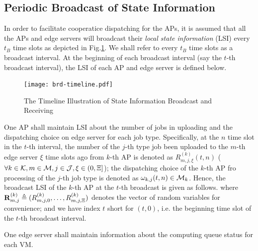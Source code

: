 \subsection{Periodic Broadcast of State Information}
In order to facilitate cooperatice dispatching for the APs, it is assumed that all the APs and edge servers will broadcast their \emph{local state information} (LSI) every $t_B$ time slots as depicted in Fig.\ref{fig:brd-timeline}.
We shall refer to every $t_B$ time slots as a broadcast interval.
At the beginning of each broadcast interval (say the $t$-th broadcast interval), the LSI of each AP and edge server is defined below.

\begin{figure}[ht]
    \centering
    \texttt{[image: brd-timeline.pdf]}
    \caption{The Timeline Illustration of State Information Broadcast and Receiving}
    \label{fig:brd-timeline}
\end{figure}

One AP shall maintain LSI about the number of jobs in uploading and the dispatching choice on edge server for each job type.
Specifically, at the $n$ time slot in the $t$-th interval, the number of the $j$-th type job been uploaded to the $m$-th edge server $\xi$ time slots ago from $k$-th AP is denoted as $R^{(k)}_{m,j,\xi}({t,n})$ ($\forall k\in\mathcal{K}, m\in\mathcal{M}, j\in\mathcal{J}, \xi\in(0,\Xi]$);
the dispatching choice of the $k$-th AP fro processing of the $j$-th job type is denoted as $\omega_{k,j}(t,n) \in \mathcal{M}_{k}$.
Hence, the broadcast LSI of the $k$-th AP at the $t$-th broadcast is given as follows.
where $\mathbf{R}^{(k)}_{m,j} \triangleq ( R^{(k)}_{m,j,0},\dots,R^{(k)}_{m,j,\Xi} )$ denotes the vector of random variables for convenience; and we have index $t$ short for $(t, 0)$, i.e. the beginning time slot of the $t$-th broadcast interval.

One edge server shall maintain information about the computing queue status for each VM.

